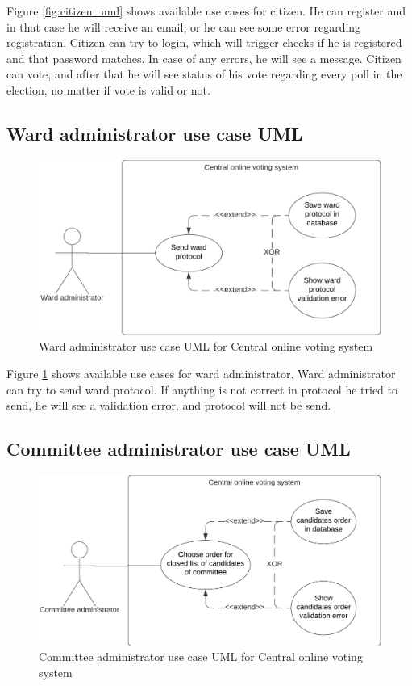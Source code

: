 \documentclass[a4paper,twoside,12pt]{book}
\newcommand{\Title}{Central online voting system}
\begin{document}
    Figure \ref{fig:citizen_uml} shows available use cases for citizen. He can register and in that case he will receive an email, 
    or he can see some error regarding registration. Citizen can try to login, which will trigger checks if he is registered and that password matches.
    In case of any errors, he will see a message. 
    Citizen can vote, and after that he will see status of his vote regarding every poll in the election, no matter if vote is valid or not.
    \pagebreak

    \subsection{Ward administrator use case UML}
    \begin{figure}[h]
      \centering
      \includegraphics[width=0.65\linewidth]{ward_admin_uml.png}
      \caption{Ward administrator use case UML for \Title}
      \label{fig:ward_admin_uml}
    \end{figure}

    Figure \ref{fig:ward_admin_uml} shows available use cases for ward administrator. Ward administrator can try to send ward protocol.
    If anything is not correct in protocol he tried to send, he will see a validation error, and protocol will not be send.

    \subsection{Committee administrator use case UML}
    \begin{figure}[h]
      \centering
      \includegraphics[width=0.65\linewidth]{committee_admin_uml.png}
      \caption{Committee administrator use case UML for \Title}
      \label{fig:committee_admin_uml}
    \end{figure}
\end{document}
